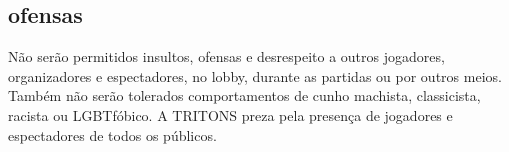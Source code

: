 \subsection{ofensas}

Não serão permitidos insultos, ofensas e desrespeito a outros jogadores, organizadores e espectadores, no lobby, durante as partidas ou por outros meios. Também não serão tolerados comportamentos de cunho machista, classicista, racista ou LGBTfóbico. A TRITONS preza pela presença de jogadores e espectadores de todos os públicos.
